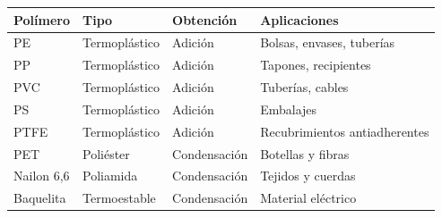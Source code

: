 \begin{center}

\renewcommand{\arraystretch}{1.25}

\begin{tabular}{p{2.6cm}p{2.3cm}p{2cm}p{5cm}}

\toprule

\textbf{Polímero} &
\textbf{Tipo} &
\textbf{Obtención} &
\textbf{Aplicaciones}

\\

\midrule

PE &
Termoplástico &
Adición &
Bolsas, envases, tuberías

\\

PP &
Termoplástico &
Adición &
Tapones, recipientes

\\

PVC &
Termoplástico &
Adición &
Tuberías, cables

\\

PS &
Termoplástico &
Adición &
Embalajes

\\

PTFE &
Termoplástico &
Adición &
Recubrimientos antiadherentes

\\

PET &
Poliéster &
Condensación &
Botellas y fibras

\\

Nailon 6,6 &
Poliamida &
Condensación &
Tejidos y cuerdas

\\

Baquelita &
Termoestable &
Condensación &
Material eléctrico

\\

\bottomrule

\end{tabular}

\end{center}


